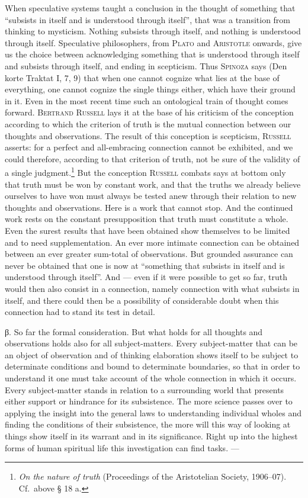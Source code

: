 \documentclass[12pt]{book}
\begin{document}
When speculative systems taught a conclusion in the thought of something that ``subsists in
itself and is understood through itself'', that was a transition from thinking to mysticism.
Nothing subsists through itself, and nothing is understood through itself. Speculative
philosophers, from \textsc{Plato} and \textsc{Aristotle} onwards, give us the choice between
acknowledging something that is understood through itself and subsists through itself, and
ending in scepticism. Thus \textsc{Spinoza} says (Den korte Traktat I, 7, 9) that when one
cannot cognize what lies at the base of everything, one cannot cognize the single things
either, which have their ground in it. Even in the most recent time such an ontological
train of thought comes forward. \textsc{Bertrand Russell} lays it at the base of his
criticism of the conception according to which the criterion of truth is the mutual
connection between our thoughts and observations. The result of this conception is
scepticism, \textsc{Russell} asserts: for a perfect and all-embracing connection cannot be
exhibited, and we could therefore, according to that criterion of truth, not be sure of the
validity of a single judgment.\footnote{\textit{On the nature of truth} (Proceedings of the
Aristotelian Society, 1906--07). Cf.\ above § 18 a.} But the conception \textsc{Russell}
combats says at bottom only that truth must be won by constant work, and that the truths we
already believe ourselves to have won must always be tested anew through their relation to
new thoughts and observations. Here is a work that cannot stop. And the continued work rests
on the constant presupposition that truth must constitute a whole. Even the surest results
that have been obtained show themselves to be limited and to need supplementation. An ever
more intimate connection can be obtained between an ever greater sum-total of observations.
But grounded assurance can never be obtained that one is now at ``something that subsists in
itself and is understood through itself''. And --- even if it were possible to get so far,
truth would then also consist in a connection, namely connection with what subsists in
itself, and there could then be a possibility of considerable doubt when this connection had
to stand its test in detail.

β. So far the formal consideration. But what holds for all thoughts and observations holds
also for all subject-matters. Every subject-matter that can be an object of observation and
of thinking elaboration shows itself to be subject to determinate conditions and bound to
determinate boundaries, so that in order to understand it one must take account of the whole
connection in which it occurs. Every subject-matter stands in relation to a surrounding world
that presents either support or hindrance for its subsistence. The more science passes over
to applying the insight into the general laws to understanding individual wholes and finding
the conditions of their subsistence, the more will this way of looking at things show itself
in its warrant and in its significance. Right up into the highest forms of human spiritual
life this investigation can find tasks. ---
\end{document}
